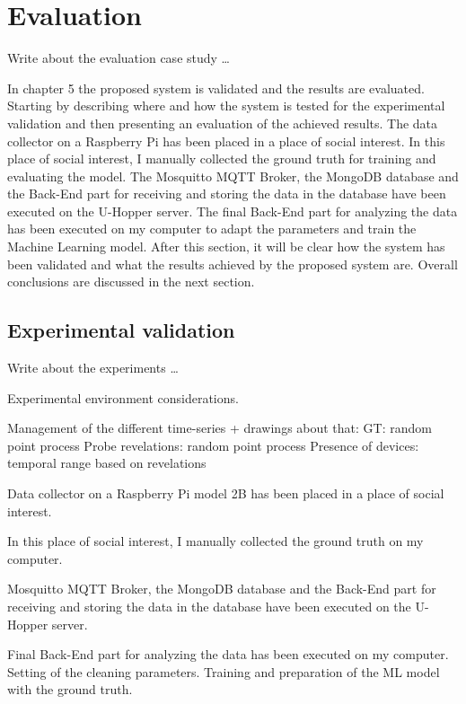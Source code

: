 \chapter{Evaluation}
\label{cha:evaluation}
\vspace{0.4 cm} 

Write about the evaluation case study \dots

In chapter 5 the proposed system is validated and the results are evaluated.
Starting by describing where and how the system is tested for the experimental validation and then presenting an evaluation of the achieved results. The data collector on a Raspberry Pi has been placed in a place of social interest. In this place of social interest, I manually collected the ground truth for training and evaluating the model. The Mosquitto MQTT Broker, the MongoDB database and the Back-End part for receiving and storing the data in the database have been executed on the U-Hopper server. The final Back-End part for analyzing the data has been executed on my computer to adapt the parameters and train the Machine Learning model. After this section, it will be clear how the system has been validated and what the results achieved by the proposed system are. Overall conclusions are discussed in the next section.


\section{Experimental validation}
\label{sec:expval}
\vspace{0.2 cm} 

Write about the experiments \dots

Experimental environment considerations.

Management of the different time-series + drawings about that:
GT: random point process
Probe revelations: random point process
Presence of devices: temporal range based on revelations

Data collector on a Raspberry Pi model 2B has been placed in a place of social interest.

In this place of social interest, I manually collected the ground truth on my computer.

Mosquitto MQTT Broker, the MongoDB database and the Back-End part for receiving and storing the data in the database have been executed on the U-Hopper server.

Final Back-End part for analyzing the data has been executed on my computer. Setting of the cleaning parameters. Training and preparation of the ML model with the ground truth.


